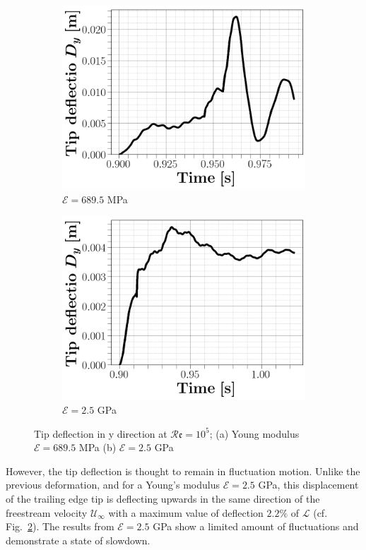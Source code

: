 \documentclass[conf]{new-aiaa}
\newcommand{\Rey}{\mathcal{R}\mathfrak{e}}
\begin{document}
\begin{figure}[ht!]
\centering
\begin{subfigure}{.45\textwidth}
\includegraphics[width=0.99\columnwidth]{figs/deflection689MPa090.png}
\caption{$\mathcal{E}=689.5$ MPa}
\label{fig:deflection689.5MPa}
\end{subfigure}
\begin{subfigure}{.45\textwidth}
\includegraphics[width=0.99\columnwidth]{figs/deflection25GPa10.png}
\caption{$\mathcal{E}=2.5$ GPa}
\label{fig:deflection2.5GPa}
\end{subfigure}
\caption{\label{fig:history} Tip deflection in y direction at $\Rey =10^5$; (a) Young modulus $\mathcal{E}=689.5$ MPa  (b) $\mathcal{E}=2.5$ GPa }
\label{fig:history}
\end{figure}
%
However, the tip deflection is thought to remain in fluctuation motion.
%
Unlike the previous deformation, and for a Young's modulus $\mathcal{E}=2.5$ GPa, this displacement of the trailing edge tip is deflecting upwards in the same direction of the freestream velocity $\mathcal{U}_\infty$ with a maximum value of deflection $2.2\%$ of $\mathcal{L}$ (cf. Fig.~\ref{fig:deflection2.5GPa}).
%
The results from $\mathcal{E}=2.5$ GPa show a limited amount of fluctuations and demonstrate a state of slowdown. 
\end{document}
